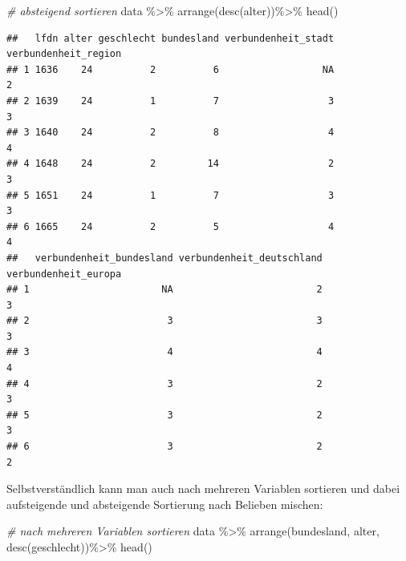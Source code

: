 \documentclass[
]{book}
\newenvironment{Shaded}{\begin{snugshade}}{\end{snugshade}}
\newcommand{\CommentTok}[1]{\textcolor[rgb]{0.56,0.35,0.01}{\textit{#1}}}
\newcommand{\FunctionTok}[1]{\textcolor[rgb]{0.00,0.00,0.00}{#1}}
\newcommand{\NormalTok}[1]{#1}
\newcommand{\SpecialCharTok}[1]{\textcolor[rgb]{0.00,0.00,0.00}{#1}}
\begin{document}
\begin{Shaded}
\begin{Highlighting}[]
\CommentTok{\# absteigend sortieren}
\NormalTok{data }\SpecialCharTok{\%\textgreater{}\%} 
  \FunctionTok{arrange}\NormalTok{(}\FunctionTok{desc}\NormalTok{(alter))}\SpecialCharTok{\%\textgreater{}\%} 
  \FunctionTok{head}\NormalTok{()}
\end{Highlighting}
\end{Shaded}

\begin{verbatim}
##   lfdn alter geschlecht bundesland verbundenheit_stadt verbundenheit_region
## 1 1636    24          2          6                  NA                    2
## 2 1639    24          1          7                   3                    3
## 3 1640    24          2          8                   4                    4
## 4 1648    24          2         14                   2                    3
## 5 1651    24          1          7                   3                    3
## 6 1665    24          2          5                   4                    4
##   verbundenheit_bundesland verbundenheit_deutschland verbundenheit_europa
## 1                       NA                         2                    3
## 2                        3                         3                    3
## 3                        4                         4                    4
## 4                        3                         2                    3
## 5                        3                         2                    3
## 6                        3                         2                    2
\end{verbatim}

Selbstverständlich kann man auch nach mehreren Variablen sortieren und dabei aufsteigende und absteigende Sortierung nach Belieben mischen:

\begin{Shaded}
\begin{Highlighting}[]
\CommentTok{\# nach mehreren Variablen sortieren}
\NormalTok{data }\SpecialCharTok{\%\textgreater{}\%} 
  \FunctionTok{arrange}\NormalTok{(bundesland, alter, }\FunctionTok{desc}\NormalTok{(geschlecht))}\SpecialCharTok{\%\textgreater{}\%} 
  \FunctionTok{head}\NormalTok{()}
\end{Highlighting}
\end{Shaded}
\end{document}
